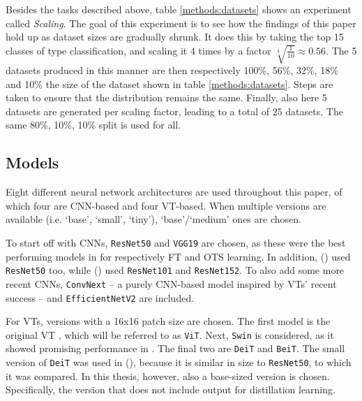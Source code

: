 Besides the tasks described above, table \ref{methods:datasets} shows an experiment called \textit{Scaling}. The goal of this experiment is to see how the findings of this paper hold up as dataset sizes are gradually shrunk. It does this by taking the top 15 classes of type classification, and scaling it 4 times by a factor $\sqrt[4]{\frac{1}{10}} \approx 0.56$. The 5 datasets produced in this manner are then respectively 100\%, 56\%, 32\%, 18\% and 10\% the size of the dataset shown in table \ref{methods:datasets}. Steps are taken to ensure that the distribution remains the same. Finally, also here 5 datasets are generated per scaling factor, leading to a total of 25 datasets. The same 80\%, 10\%, 10\% split is used for all.


\subsection{Models} \label{methods:models}
Eight different neural network architectures are used throughout this paper, of which four are CNN-based and four VT-based. When multiple versions are available (i.e. `base', `small', `tiny'), `base'/`medium' ones are chosen.

To start off with CNNs, \texttt{ResNet50} \citep{he2016deep} and \texttt{VGG19} \citep{simonyan2014very} are chosen, as these were the best performing models in \citeauthor{sabatelli2018deep} for respectively FT and OTS learning. In addition, \citeauthor{matsoukas2021time} (\citeyear{matsoukas2021time}) used \texttt{ResNet50} too, while \citeauthor{zhou2021convnets} (\citeyear{zhou2021convnets}) used \texttt{ResNet101} and \texttt{ResNet152}. To also add some more recent CNNs, \texttt{ConvNext} \citep{liu2022convnet} -- a purely CNN-based model inspired by VTs' recent success -- and \texttt{EfficientNetV2} \citep{tan2021efficientnetv2} are included.

For VTs, versions with a 16x16 patch size are chosen. The first model is the original VT \citep{dosovitskiy2020image}, which will be referred to as \texttt{ViT}. Next, \texttt{Swin} \citep{liu2021swin} is considered, as it showed promising performance in \citeauthor{zhou2021convnets}. The final two are \texttt{DeiT} and \texttt{BeiT}. The small version of \texttt{DeiT} was used in \citeauthor{matsoukas2021time} (\citeyear{matsoukas2021time}), because it is similar in size to \texttt{ResNet50}, to which it was compared. In this thesis, however, also a base-sized version is chosen. Specifically, the version that does not include output for distillation learning.

